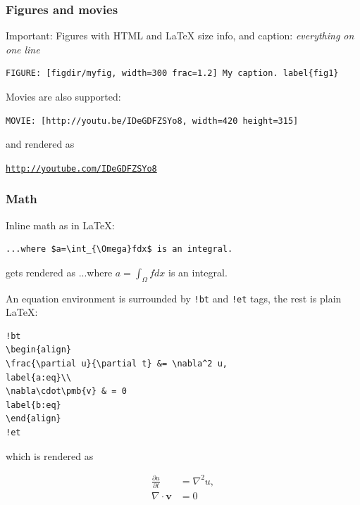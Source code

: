 \documentclass{beamer}
\newenvironment{graybox1admon}[1][]{\begin{block}{#1}}{\end{block}}
\newcounter{doconce:exercise:counter}
\newenvironment{doconce:movie}{}{}
\newcounter{doconce:movie:counter}
\begin{document}
\begin{frame}
\frametitle{Figures and movies}

\begin{graybox1admon}[Important:]
Figures with HTML and {\LaTeX} size info, and caption: \emph{everything on one line}
\end{graybox1admon}



\begin{Verbatim}[numbers=none,fontsize=\fontsize{9pt}{9pt},baselinestretch=0.95]
FIGURE: [figdir/myfig, width=300 frac=1.2] My caption. label{fig1}
\end{Verbatim}

Movies are also supported:

\begin{Verbatim}[numbers=none,fontsize=\fontsize{9pt}{9pt},baselinestretch=0.95]
MOVIE: [http://youtu.be/IDeGDFZSYo8, width=420 height=315]
\end{Verbatim}
and rendered as


\begin{doconce:movie}
\begin{center}
\href{{http://youtube.com/IDeGDFZSYo8}}{\nolinkurl{http://youtube.com/IDeGDFZSYo8}}
\end{center}
\end{doconce:movie}
\end{frame}

\begin{frame}
\frametitle{Math}

Inline math as in {\LaTeX}:

\begin{Verbatim}[numbers=none,fontsize=\fontsize{9pt}{9pt},baselinestretch=0.95]
...where $a=\int_{\Omega}fdx$ is an integral.
\end{Verbatim}
gets rendered as ...where $a=\int_{\Omega}fdx$ is an integral.


An equation environment is surrounded by \Verb~!bt~ and \Verb~!et~ tags,
the rest is plain {\LaTeX}:

\begin{Verbatim}[numbers=none,fontsize=\fontsize{9pt}{9pt},baselinestretch=0.95]
!bt
\begin{align}
\frac{\partial u}{\partial t} &= \nabla^2 u,
label{a:eq}\\ 
\nabla\cdot\pmb{v} & = 0
label{b:eq}
\end{align}
!et
\end{Verbatim}
which is rendered as

\begin{align}
\frac{\partial u}{\partial t} &= \nabla^2 u,
\label{a:eq}\\ 
\nabla\cdot\pmb{v} & = 0
\label{b:eq}
\end{align}
\end{frame}
\end{document}
